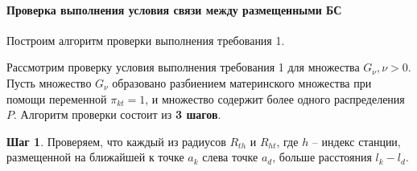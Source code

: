 


\paragraph{Проверка выполнения условия связи между размещенными БС}

Построим алгоритм проверки выполнения требования 1.



Рассмотрим проверку условия выполнения требования 1 для  множества  $G_\nu, \nu>0$. 
Пусть множество $G_\nu$  образовано разбиением материнского множества при помощи переменной $\pi_{kt}=1$, и множество содержит более одного распределения $P$.
Алгоритм проверки состоит из \textbf{3 шагов}.

\textbf{Шаг 1}. Проверяем, что каждый из радиусов $R_{th}$ и $R_{ht}$, где $h$ – индекс станции, размещенной на ближайшей к точке $a_k$ слева точке $a_d$, больше расстояния $l_k-l_d$. 

